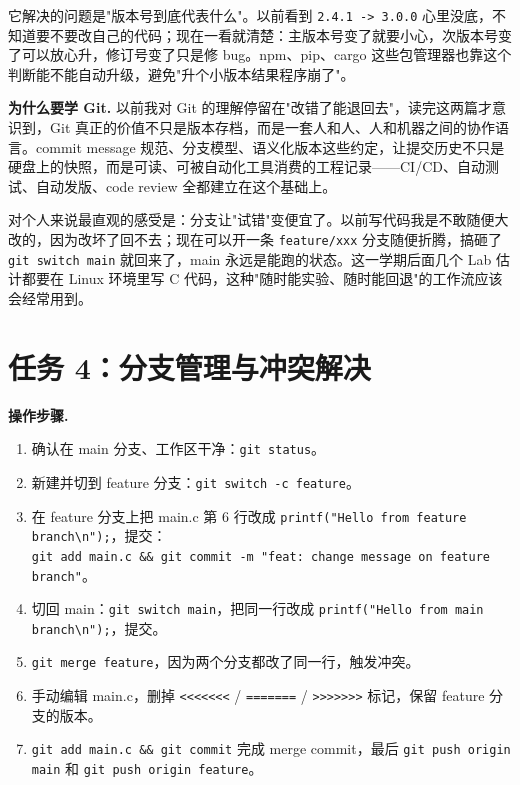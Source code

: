\documentclass[11pt]{article}
\begin{document}
\par 它解决的问题是"版本号到底代表什么"。以前看到 \texttt{2.4.1 -> 3.0.0} 心里没底，不知道要不要改自己的代码；现在一看就清楚：主版本号变了就要小心，次版本号变了可以放心升，修订号变了只是修 bug。npm、pip、cargo 这些包管理器也靠这个判断能不能自动升级，避免"升个小版本结果程序崩了"。

\textbf{为什么要学 Git.} 以前我对 Git 的理解停留在"改错了能退回去"，读完这两篇才意识到，Git 真正的价值不只是版本存档，而是一套人和人、人和机器之间的协作语言。commit message 规范、分支模型、语义化版本这些约定，让提交历史不只是硬盘上的快照，而是可读、可被自动化工具消费的工程记录——CI/CD、自动测试、自动发版、code review 全都建立在这个基础上。

\par 对个人来说最直观的感受是：分支让"试错"变便宜了。以前写代码我是不敢随便大改的，因为改坏了回不去；现在可以开一条 \texttt{feature/xxx} 分支随便折腾，搞砸了 \texttt{git switch main} 就回来了，main 永远是能跑的状态。这一学期后面几个 Lab 估计都要在 Linux 环境里写 C 代码，这种"随时能实验、随时能回退"的工作流应该会经常用到。

\section{任务 4：分支管理与冲突解决}

\textbf{操作步骤.}

\begin{enumerate}
  \item 确认在 main 分支、工作区干净：\texttt{git status}。
  \item 新建并切到 feature 分支：\texttt{git switch -c feature}。
  \item 在 feature 分支上把 main.c 第 6 行改成 \texttt{printf("Hello from feature branch\textbackslash n");}，提交：\\
  \texttt{git add main.c \&\& git commit -m "feat: change message on feature branch"}。
  \item 切回 main：\texttt{git switch main}，把同一行改成 \texttt{printf("Hello from main branch\textbackslash n");}，提交。
  \item \texttt{git merge feature}，因为两个分支都改了同一行，触发冲突。
  \item 手动编辑 main.c，删掉 \texttt{<<<<<<<} / \texttt{=======} / \texttt{>>>>>>>} 标记，保留 feature 分支的版本。
  \item \texttt{git add main.c \&\& git commit} 完成 merge commit，最后 \texttt{git push origin main} 和 \texttt{git push origin feature}。
\end{enumerate}
\end{document}
